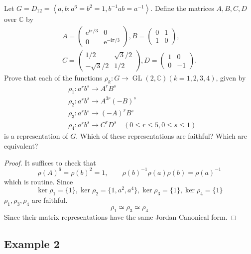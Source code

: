 Let $G=D_{12}=\left\langle a, b: a^6=b^2=1, b^{-1} a b=a^{-1}\right\rangle$. Define the matrices $A, B, C, D$ over $\mathbb{C}$ by
\[
\begin{gathered}
A=\left(\begin{array}{ll}
\mathrm{e}^{\mathrm{i} \pi / 3} & 0 \\
0 & \mathrm{e}^{-\mathrm{i} \pi / 3}
\end{array}\right), B=\left(\begin{array}{ll}
0 & 1 \\
1 & 0
\end{array}\right), \\
C=\left(\begin{array}{cl}
1 / 2 & \sqrt{ 3}  / 2 \\
-\sqrt{3 }  / 2 & 1 / 2
\end{array}\right), D=\left(\begin{array}{rr}
1 & 0 \\
0 & -1
\end{array}\right) .
\end{gathered}
\]
Prove that each of the functions $\rho_k: G \rightarrow \operatorname{GL}(2, \mathbb{C})(k=1,2,3,4)$, given by
\[
\begin{aligned}
& \rho_1: a^r b^s \rightarrow A^r B^s \\
& \rho_2: a^r b^s \rightarrow A^{3 r}(-B)^s \\
& \rho_3: a^r b^s \rightarrow(-A)^r B^s \\
& \rho_4: a^r b^s \rightarrow C^r D^s \quad(0 \leqslant r \leqslant 5,0 \leqslant s \leqslant 1)
\end{aligned}
\]
is a representation of $G$. Which of these representations are faithful? Which are equivalent?
\begin{proof}
It suffices to check that
\[
\rho(A)^{6}=\rho(b)^{2}=1,\qquad \rho(b)^{-1}\rho(a)\rho(b)=\rho(a)^{-1}
\]
which is routine. Since
\[
\ker \rho_1=\{ 1 \},\ker \rho_2=\{ 1,a^2,a^{4} \},\ker \rho_3=\{ 1 \},\ker \rho_4=\{ 1 \}
\]
$\rho_1,\rho_3,\rho_4$ are faithful.
\[
\rho_1\simeq \rho_3\simeq \rho_4
\]
Since their matrix representations have the same Jordan Canonical form.
\end{proof}

\subsection{Example 2}

